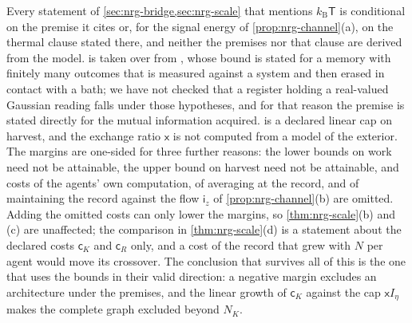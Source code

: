 \begin{remark}\label{rem:nrg-premises}
Every statement of \cref{sec:nrg-bridge,sec:nrg-scale} that mentions $k_{\mathrm B}\mathsf T$ is conditional on the premise it cites or, for the signal energy of \cref{prop:nrg-channel}(a), on the thermal clause stated there, and neither the premises nor that clause are derived from the model.  is taken over from \citet{sagawa2009minimal}, whose bound is stated for a memory with finitely many outcomes that is measured against a system and then erased in contact with a bath; we have not checked that a register holding a real-valued Gaussian reading falls under those hypotheses, and for that reason the premise is stated directly for the mutual information acquired.  is a declared linear cap on harvest, and the exchange ratio $\mathsf x$ is not computed from a model of the exterior. The margins are one-sided for three further reasons: the lower bounds on work need not be attainable, the upper bound on harvest need not be attainable, and costs of the agents' own computation, of averaging at the record, and of maintaining the record against the flow $\mathsf i_z$ of \cref{prop:nrg-channel}(b) are omitted. Adding the omitted costs can only lower the margins, so \cref{thm:nrg-scale}(b) and (c) are unaffected; the comparison in \cref{thm:nrg-scale}(d) is a statement about the declared costs $\mathsf c_K$ and $\mathsf c_R$ only, and a cost of the record that grew with $N$ per agent would move its crossover. The conclusion that survives all of this is the one that uses the bounds in their valid direction: a negative margin excludes an architecture under the premises, and the linear growth of $\mathsf c_K$ against the cap $\mathsf xI_\eta$ makes the complete graph excluded beyond $N_K$.
\end{remark}
